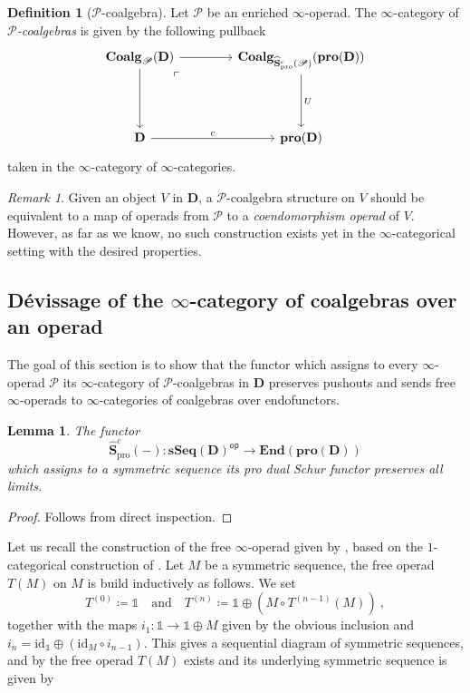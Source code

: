 \documentclass[a4paper,12pt]{amsart}
\theoremstyle{plain}
\newtheorem{lemma}[theorem]{Lemma}%
\theoremstyle{definition}
\newtheorem{definition}[theorem]{Definition}%
\theoremstyle{remark}
\newtheorem{remark}[theorem]{\sc Remark}%
\begin{document}
\begin{definition}[$\mathscr{P}$-coalgebra]\label{def: infinity categorical P-coalgebras}
Let $\mathscr{P}$ be an enriched $\infty$-operad. The $\infty$-category of $\mathscr{P}$\textit{-coalgebras} is given by the following pullback
\[
\begin{tikzcd}[column sep=3.5pc,row sep=3.5pc]
\mathbf{Coalg}_\mathscr{P}(\mathbf{D}) \arrow[r] \arrow[d] \arrow[dr, phantom, "\ulcorner", very near start]
&\mathbf{Coalg}_{\widehat{\mathbf{S}}^c_{\mathrm{pro}}(\mathscr{P})}(\mathbf{pro}(\mathbf{D})) \arrow[d,"U"]\\
\mathbf{D} \arrow[r,"c"] 
&\mathbf{pro}(\mathbf{D})
\end{tikzcd}
\]
taken in the $\infty$-category of $\infty$-categories. 
\end{definition}

\begin{remark}
Given an object $V$ in $\mathbf{D}$, a $\mathscr{P}$-coalgebra structure on $V$ should be equivalent to a map of operads from $\mathscr{P}$ to a \textit{coendomorphism operad} of $V$. However, as far as we know, no such construction exists yet in the $\infty$-categorical setting with the desired properties.
\end{remark}

\subsection{Dévissage of the $\infty$-category of coalgebras over an operad}
The goal of this section is to show that the functor which assigns to every $\infty$-operad $\mathscr{P}$ its $\infty$-category of $\mathscr{P}$-coalgebras in $\mathbf{D}$ preserves pushouts and sends free $\infty$-operads to $\infty$-categories of coalgebras over endofunctors. 

\begin{lemma}\label{lemma: pro-Schur functor preserves limits}
The functor 
\[
\widehat{\mathbf{S}}^c_{\mathrm{pro}}(-): \mathbf{sSeq}(\mathbf{D})^{\mathsf{op}} \longrightarrow \mathbf{End}(\mathbf{pro}(\mathbf{D}))
\]
which assigns to a symmetric sequence its pro dual Schur functor preserves all limits. 
\end{lemma}

\begin{proof}
Follows from direct inspection. 
\end{proof}

Let us recall the construction of the free $\infty$-operad given by \cite[Appendix B]{pdalgebras}, based on the $1$-categorical construction of \cite{Kelly80}. Let $M$ be a symmetric sequence, the free operad $T(M)$ on $M$ is build inductively as follows. We set 
\[
T^{(0)} \coloneqq \mathbb{1} \quad \text{and} \quad T^{(n)} \coloneqq \mathbb{1} \oplus \left(M \circ T^{(n-1)}(M)\right)~,
\]
together with the maps $i_1: \mathbb{1} \longrightarrow \mathbb{1} \oplus M$ given by the obvious inclusion and $i_n = \mathrm{id}_{\mathbb{1}} \oplus (\mathrm{id}_{M} \circ i_{n-1})$. This gives a sequential diagram of symmetric sequences, and by \cite[Theorem B.2]{pdalgebras} the free operad $T(M)$ exists and its underlying symmetric sequence is given by
\end{document}
